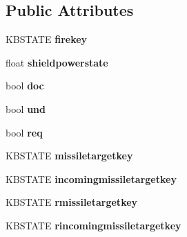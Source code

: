 \subsection*{Public Attributes}
\begin{DoxyCompactItemize}
\item 
K\+B\+S\+T\+A\+TE {\bfseries firekey}\hypertarget{structFIREKEYBOARDTYPE_a1d433e2d88f231794bdb04933fdc3f54}{}\label{structFIREKEYBOARDTYPE_a1d433e2d88f231794bdb04933fdc3f54}

\item 
float {\bfseries shieldpowerstate}\hypertarget{structFIREKEYBOARDTYPE_ae99c13918b6db8327c1d567178c5208b}{}\label{structFIREKEYBOARDTYPE_ae99c13918b6db8327c1d567178c5208b}

\item 
bool {\bfseries doc}\hypertarget{structFIREKEYBOARDTYPE_af3688c4291b5f06ccca88a25d10531c8}{}\label{structFIREKEYBOARDTYPE_af3688c4291b5f06ccca88a25d10531c8}

\item 
bool {\bfseries und}\hypertarget{structFIREKEYBOARDTYPE_aed18ff261df6aef296fe5d5e980d988f}{}\label{structFIREKEYBOARDTYPE_aed18ff261df6aef296fe5d5e980d988f}

\item 
bool {\bfseries req}\hypertarget{structFIREKEYBOARDTYPE_a12b857536e5b236a2781ad29bb389d5e}{}\label{structFIREKEYBOARDTYPE_a12b857536e5b236a2781ad29bb389d5e}

\item 
K\+B\+S\+T\+A\+TE {\bfseries missiletargetkey}\hypertarget{structFIREKEYBOARDTYPE_abf2e1e6d39306a81b3493e5f06b6584a}{}\label{structFIREKEYBOARDTYPE_abf2e1e6d39306a81b3493e5f06b6584a}

\item 
K\+B\+S\+T\+A\+TE {\bfseries incomingmissiletargetkey}\hypertarget{structFIREKEYBOARDTYPE_a0b57edfefafb576474297ee79de5fd5d}{}\label{structFIREKEYBOARDTYPE_a0b57edfefafb576474297ee79de5fd5d}

\item 
K\+B\+S\+T\+A\+TE {\bfseries rmissiletargetkey}\hypertarget{structFIREKEYBOARDTYPE_ac8588f7367d6b0b9f4eed7c0d3417e9e}{}\label{structFIREKEYBOARDTYPE_ac8588f7367d6b0b9f4eed7c0d3417e9e}

\item 
K\+B\+S\+T\+A\+TE {\bfseries rincomingmissiletargetkey}\hypertarget{structFIREKEYBOARDTYPE_a32147ec72ccd25ed375471d9aa178b01}{}\label{structFIREKEYBOARDTYPE_a32147ec72ccd25ed375471d9aa178b01}


\end{DoxyCompactItemize}
